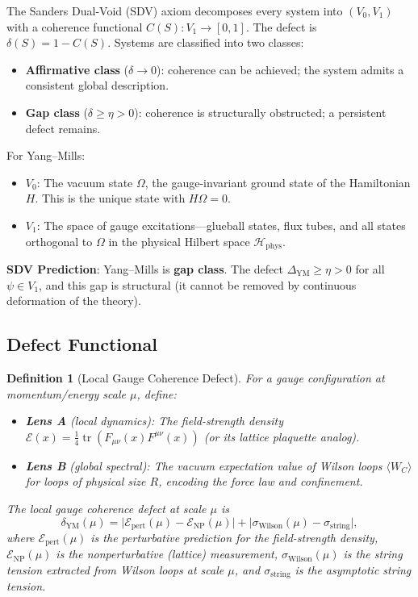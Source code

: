 \documentclass[11pt]{article}
\newtheorem{definition}[theorem]{Definition}
\DeclareMathOperator{\tr}{tr}
\begin{document}
The Sanders Dual-Void (SDV) axiom decomposes every system into
$(V_0, V_1)$ with a coherence functional $C(S): V_1 \to [0,1]$.
The defect is $\delta(S) = 1 - C(S)$.  Systems are classified into
two classes:
\begin{itemize}
  \item \textbf{Affirmative class} ($\delta \to 0$): coherence can be
    achieved; the system admits a consistent global description.
  \item \textbf{Gap class} ($\delta \geq \eta > 0$): coherence is
    structurally obstructed; a persistent defect remains.
\end{itemize}

For Yang--Mills:
\begin{itemize}
  \item $V_0$: The vacuum state $\Omega$, the gauge-invariant ground
    state of the Hamiltonian $H$.  This is the unique state with
    $H\Omega = 0$.
  \item $V_1$: The space of gauge excitations---glueball states, flux
    tubes, and all states orthogonal to $\Omega$ in the physical
    Hilbert space $\mathcal{H}_{\mathrm{phys}}$.
\end{itemize}

\noindent\textbf{SDV Prediction}: Yang--Mills is \textbf{gap class}.
The defect $\Delta_{\mathrm{YM}} \geq \eta > 0$ for all
$\psi \in V_1$, and this gap is structural (it cannot be removed by
continuous deformation of the theory).

\subsection{Defect Functional}

\begin{definition}[Local Gauge Coherence Defect]
\label{def:local-defect}
For a gauge configuration at momentum/energy scale $\mu$, define:
\begin{itemize}
  \item \textbf{Lens A} (local dynamics): The field-strength density
    $\mathcal{E}(x) = \frac{1}{4}\tr(F_{\mu\nu}(x)F^{\mu\nu}(x))$
    (or its lattice plaquette analog).
  \item \textbf{Lens B} (global spectral): The vacuum expectation
    value of Wilson loops $\langle W_C \rangle$ for loops of physical
    size $R$, encoding the force law and confinement.
\end{itemize}
The \emph{local gauge coherence defect} at scale $\mu$ is
\begin{equation}\label{eq:local-defect}
  \delta_{\mathrm{YM}}(\mu) =
  \bigl|\mathcal{E}_{\mathrm{pert}}(\mu) -
  \mathcal{E}_{\mathrm{NP}}(\mu)\bigr|
  + \bigl|\sigma_{\mathrm{Wilson}}(\mu) - \sigma_{\mathrm{string}}\bigr|,
\end{equation}
where $\mathcal{E}_{\mathrm{pert}}(\mu)$ is the perturbative prediction
for the field-strength density, $\mathcal{E}_{\mathrm{NP}}(\mu)$ is
the nonperturbative (lattice) measurement,
$\sigma_{\mathrm{Wilson}}(\mu)$ is the string tension extracted from
Wilson loops at scale $\mu$, and $\sigma_{\mathrm{string}}$ is the
asymptotic string tension.
\end{definition}
\end{document}
